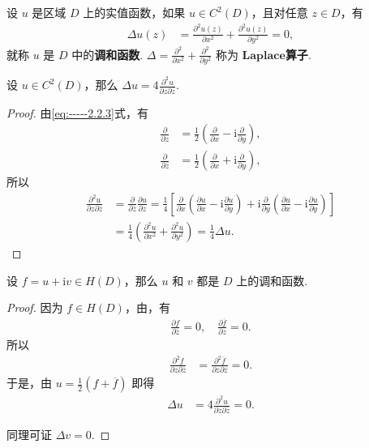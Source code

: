 \documentclass[../../main.tex]{subfiles}%
\begin{document}
\begin{definition}[调和函数]
设 $u$ 是区域 $D$ 上的实值函数，如果 $u \in C^2(D)$，且对任意 $z \in D$，有
\begin{align}
\Delta u(z) &= \frac{\partial^2 u(z)}{\partial x^2} + \frac{\partial^2 u(z)}{\partial y^2} = 0, \label{eq:2.2.7}
\end{align}
就称 $u$ 是 $D$ 中的\textbf{调和函数}. $\Delta = \frac{\partial^2}{\partial x^2} + \frac{\partial^2}{\partial y^2}$ 称为 $\mathbf{Laplace}$\textbf{算子}.
\end{definition}

\begin{proposition}
设 $u \in C^2(D)$，那么 $\Delta u = 4 \frac{\partial^2 u}{\partial z \partial \overline{z}}$.
\end{proposition}
\begin{proof}
由\eqref{eq:-----2.2.3}式，有
\begin{align*}
\frac{\partial}{\partial z} &= \frac{1}{2}\left( \frac{\partial}{\partial x} - \text{i}\frac{\partial}{\partial y} \right), \\
\frac{\partial}{\partial \overline{z}} &= \frac{1}{2}\left( \frac{\partial}{\partial x} + \text{i}\frac{\partial}{\partial y} \right),
\end{align*}
所以
\begin{align*}
\frac{\partial^2 u}{\partial z \partial \overline{z}} &= \frac{\partial}{\partial \overline{z}} \frac{\partial u}{\partial z} = \frac{1}{4} \left[ \frac{\partial}{\partial x} \left( \frac{\partial u}{\partial x} - \mathrm{i} \frac{\partial u}{\partial y} \right) + \mathrm{i} \frac{\partial}{\partial y} \left( \frac{\partial u}{\partial x} - \mathrm{i} \frac{\partial u}{\partial y} \right) \right] \\
&= \frac{1}{4} \left( \frac{\partial^2 u}{\partial x^2} + \frac{\partial^2 u}{\partial y^2} \right) = \frac{1}{4} \Delta u.
\end{align*}
\end{proof}

\begin{theorem}\label{theorem:全纯函数的实部和虚部都是调和函数}
设 $f = u + \mathrm{i}v \in H(D)$，那么 $u$ 和 $v$ 都是 $D$ 上的调和函数.
\end{theorem}
\begin{proof}
因为 $f \in H(D)$，由，有
\begin{align*}
\frac{\partial f}{\partial \overline{z}} = 0, \quad
\frac{\partial \overline{f}}{\partial z} = 0.
\end{align*}
所以
\begin{align*}
\frac{\partial^2 f}{\partial z \partial \overline{z}} &= \frac{\partial^2 \overline{f}}{\partial z \partial \overline{z}} = 0.
\end{align*}
于是，由 $u = \frac{1}{2}(f + \overline{f})$ 即得
\begin{align*}
\Delta u &= 4 \frac{\partial^2 u}{\partial z \partial \overline{z}} = 0.
\end{align*}

同理可证 $\Delta v = 0$.
\end{proof}
\end{document}
